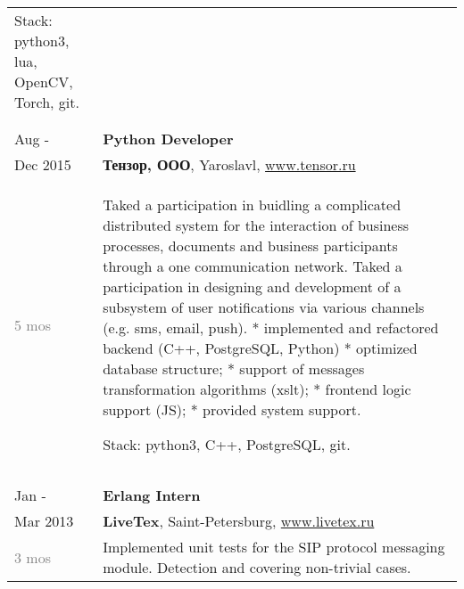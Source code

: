 \documentclass[a4paper,10pt]{article}
\begin{document}
\begin{tabularx}{\textwidth}{lX}
{                                    Stack: python3, lua, OpenCV, Torch, git.
                                } \\

    \multicolumn{2}{c}{}\\\\
    
    Aug -                   &   \textbf{Python Developer}\\
    Dec 2015                &   \textbf{Тензор, ООО}, Yaroslavl,
                                \href{www.tensor.ru}{www.tensor.ru} \\
    \textcolor{gray}
    {5 mos} 
                            &   \footnotesize{

                                    Taked a participation in buidling a complicated distributed system for the interaction of business processes, documents and business participants through a one communication network.\newline\newline
                                    Taked a participation in designing and development of a subsystem of user
                                    notifications via various channels (e.g. sms, email, push).\newline
                                    * implemented and refactored backend (C++, PostgreSQL, Python)\newline
                                    * optimized database structure;\newline
                                    * support of messages transformation algorithms (xslt);\newline
                                    * frontend logic support (JS);\newline
                                    * provided system support.\newline

                                    Stack: python3, C++, PostgreSQL, git.
                                } \\
    
    \multicolumn{2}{c}{}\\\\

    Jan -                   &   \textbf{Erlang Intern} \\
    Mar 2013                &   \textbf{LiveTex}, Saint-Petersburg,
                                \href{www.livetex.ru}{www.livetex.ru} \\
    \textcolor{gray}
    {3 mos}
                            &   \footnotesize{

                                    Implemented unit tests for the SIP protocol messaging module. Detection and covering non-trivial cases.
                                }

\end{tabularx}
\end{document}
